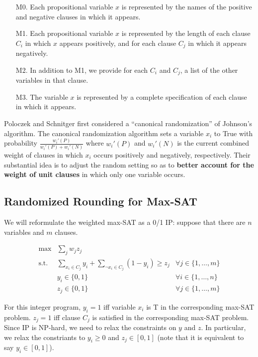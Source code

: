 \begin{itemize}
    \item[M0.] Each propositional variable $x$ is represented by the names of the positive and negative clauses in which it appears.
    \item[M1.] Each propositional variable $x$ is represented by the length of each clause $C_i$ in which $x$ appears positively, and for each clause $C_j$ in which it appears negatively.
    \item[M2.] In addition to M1, we provide for each $C_i$ and $C_j$, a list of the other variables in that clause.
    \item[M3.] The variable $x$ is represented by a complete specification of each clause in which it appears.
\end{itemize}

Poloczek and Schnitger first considered a ``canonical randomization'' of Johnson's algorithm. The canonical randomization algorithm sets a variable $x_i$ to True with probability $\frac{w_i'(P)}{w_i'(P) + w_i'(N)}$ where $w_i'(P)$ and $w_i'(N)$ is the current combined weight of clauses in which $x_i$ occurs positively and negatively, respectively. Their substantial idea is to adjust the random setting so as to \textbf{better account for the weight of unit clauses} in which only one variable occurs. 

\subsection{Randomized Rounding for Max-SAT}

We will reformulate the weighted max-SAT as a 0/1 IP: suppose that there are $n$ variables and $m$ clauses.

$$
\begin{array}{lllll}
    \max & \sum_{j} w_j z_j \\
    \text{s.t.} & \sum_{x_i \in C_j} y_i + \sum_{\neg x_i \in C_j} (1-y_i) \geq z_j & \forall j \in \{1,\ldots,m\} \\
    & y_i \in \{0,1\} & \forall i \in \{1,\ldots,n\} \\
    & z_j \in \{0,1\} & \forall j \in \{1,\ldots,m\}
\end{array}
$$

For this integer program, $y_i = 1$ iff variable $x_i$ is T in the corresponding max-SAT problem. $z_j = 1$ iff clause $C_j$ is satisfied in the corresponding max-SAT problem. Since IP is NP-hard, we need to relax the constraints on $y$ and $z$. In particular, we relax the constriants to $y_i \geq 0$ and $z_j \in [0,1]$ (note that it is equivalent to say $y_i \in [0,1]$).


